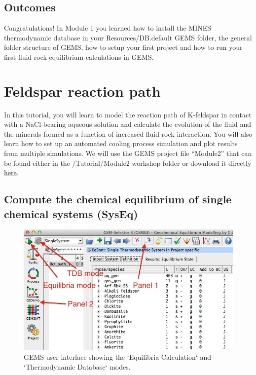 \documentclass[
]{book}
\begin{document}
\hypertarget{outcomes}{%
\section{Outcomes}\label{outcomes}}

Congratulations! In Module 1 you learned how to install the MINES thermodynamic database in your Resources/DB.default GEMS folder, the general folder structure of GEMS, how to setup your first project and how to run your first fluid-rock equilibrium calculations in GEMS.

\hypertarget{module2}{%
\chapter{Feldspar reaction path}\label{module2}}

In this tutorial, you will learn to model the reaction path of K-feldspar in contact with a NaCl-bearing aqueous solution and calculate the evolution of the fluid and the minerals formed as a function of increased fluid-rock interaction. You will also learn how to set up an automated cooling process simulation and plot results from multiple simulations. We will use the GEMS project file ``Module2'' that can be found either in the /Tutorial/Module2 workshop folder or download it directly \href{https://geoinfo.nmt.edu/mines-tdb/GEMS-files/Module2.zip}{here}.

\hypertarget{compute-the-chemical-equilibrium-of-single-chemical-systems-syseq}{%
\section{Compute the chemical equilibrium of single chemical systems (SysEq)}\label{compute-the-chemical-equilibrium-of-single-chemical-systems-syseq}}

\begin{figure}
\includegraphics[width=0.7\linewidth]{figures/module2/fig-1} \caption{GEMS user interface showing the `Equilibria Calculation` and `Thermodynamic Database` modes.}\label{fig:fig-1b}
\end{figure}
\end{document}
